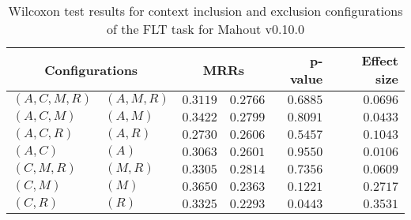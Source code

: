 
\begin{table}
\begin{spacing}{1.2}
\centering
\caption{Wilcoxon test results for context inclusion and exclusion configurations of the FLT task for Mahout v0.10.0}
\label{table:versus-wilcox-mahout-flt-context}
\begin{tabular}{ll|rr|rr}
\toprule
      \multicolumn{2}{c|}{Configurations} &          \multicolumn{2}{c|}{MRRs} &       p-value & Effect size \\
\midrule
 $(A,C,M,R)$ &  $(A,M,R)$ & $0.3119$ & $0.2766$ & $0.6885$ &    $0.0696$ \\
   $(A,C,M)$ &    $(A,M)$ & $0.3422$ & $0.2799$ & $0.8091$ &    $0.0433$ \\
   $(A,C,R)$ &    $(A,R)$ & $0.2730$ & $0.2606$ & $0.5457$ &    $0.1043$ \\
     $(A,C)$ &      $(A)$ & $0.3063$ & $0.2601$ & $0.9550$ &    $0.0106$ \\
   $(C,M,R)$ &    $(M,R)$ & $0.3305$ & $0.2814$ & $0.7356$ &    $0.0609$ \\
     $(C,M)$ &      $(M)$ & $0.3650$ & $0.2363$ & $0.1221$ &    $0.2717$ \\
     $(C,R)$ &      $(R)$ & $0.3325$ & $0.2293$ & $0.0443$ &    $0.3531$ \\
\bottomrule
\end{tabular}

\end{spacing}
\end{table}

